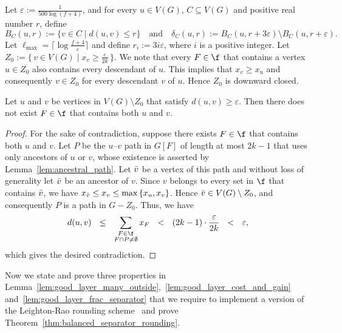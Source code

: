 Let $\varepsilon := \frac{1}{500 \log (f + 4)}$, and for every $u \in V(G)$, $C\subseteq V(G)$ and positive real number $r$, define 
$$
B_C(u, r) := \{v \in C \mid d(u, v) \leq r\}
\quad \text{and} \quad
\delta_C(u, r) := B_C(u, r + 3\varepsilon) \setminus B_C(u, r + \varepsilon).
$$
Let $\ell_{\max} = \lceil \log \frac{ f + 4}{\varepsilon}\rceil$ and define $r_{i} := 3i \varepsilon$, where $i$ is a positive integer. Let $Z_0 := \{\, v \in V(G) \mid x_v \ge \tfrac{\varepsilon}{2k} \,\}$.
We note that every $F \in \f$ that contains a vertex $u\in Z_0$ also contains every descendant of $u$. This implies that $x_v \geq x_u$ and consequently $v\in Z_0$ for every descendant $v$ of $u$. Hence $Z_0$ is downward closed.


\begin{lemma}\label{lem:F_is_local}
    Let $u$ and $v$ be vertices in $V(G)\setminus Z_0$ that satisfy $d(u,v) \geq \varepsilon$. Then there does not exist $F\in \f$ that contains both $u$ and $v$.
\end{lemma}
\begin{proof}
    For the sake of contradiction, suppose there exists $F\in\f$ that contains both $u$ and $v$. Let $P$ be the $u$--$v$ path in $G[F]$ of length at most $2k-1$ that uses only ancestors of $u$ or $v$, whose existence is asserted by Lemma~\ref{lem:ancestral_path}. Let $\Bar{v}$ be a vertex of this path and without loss of generality let $\Bar{v}$ be an ancestor of $v$. Since $v$ belongs to every set in $\f$ that contains $\Bar{v}$, we have $x_{\Bar{v}} \leq x_v \leq \max\,\{x_u,x_v\}$. Hence $\Bar{v} \in V(G) \setminus Z_0$, and consequently $P$ is a path in $G-Z_0$. Thus, we have
    $$
    d(u, v) \ \
    \leq \ \ \sum_{\substack{F \in \f \\ F \cap P \neq \emptyset}} x_F \ \
    < \ \ (2k-1)\cdot \frac{\varepsilon}{2k} \ \
    < \ \ \varepsilon,
    $$
    which gives the desired contradiction. 
\end{proof}


Now we state and prove three properties in Lemma~\ref{lem:good_layer_many_outside},~\ref{lem:good_layer_cost_and_gain} and~\ref{lem:good_layer_frac_separator} that we require to implement a version of the Leighton-Rao rounding scheme~\cite{leighton1999multicommodity} and prove Theorem~\ref{thm:balanced_separator_rounding}.


